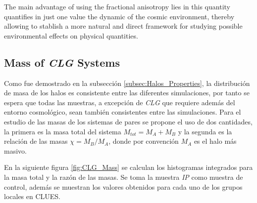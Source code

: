 The main advantage of using the fractional anisotropy lies in this 
quantity quantifies in just one value the dynamic of the cosmic 
environment, thereby allowing to stablish a more natural and direct 
framework for studying possible environmental effects on physical 
quantities.



	\subsection{Mass of \textit{CLG} Systems}
	\label{subsec:CLG_Mass}
	

Como fue demostrado en la subsección \ref{subsec:Halos_Properties}, la 
distribución de masa de los halos es consistente entre las diferentes
simulaciones, por tanto se espera que todas las muestras, a excepción de 
\textit{CLG} que requiere además del entorno cosmológico, sean también
consistentes entre las simulaciones. Para el estudio de las masas de los
sistemas de pares se propone el uso de dos cantidades, la primera es la
masa total del sistema $M_{tot} = M_A + M_B$ y la segunda es la relación 
de las masas $\chi = M_B/M_A$, donde por convención $M_A$ es el halo más 
masivo.


En la siguiente figura \ref{fig:CLG_Mass} se calculan los histogramas 
integrados para la masa total y la razón de las masas. Se toma la muestra
\textit{IP} como muestra de control, además se muestran los valores 
obtenidos para cada uno de los grupos locales en CLUES.


